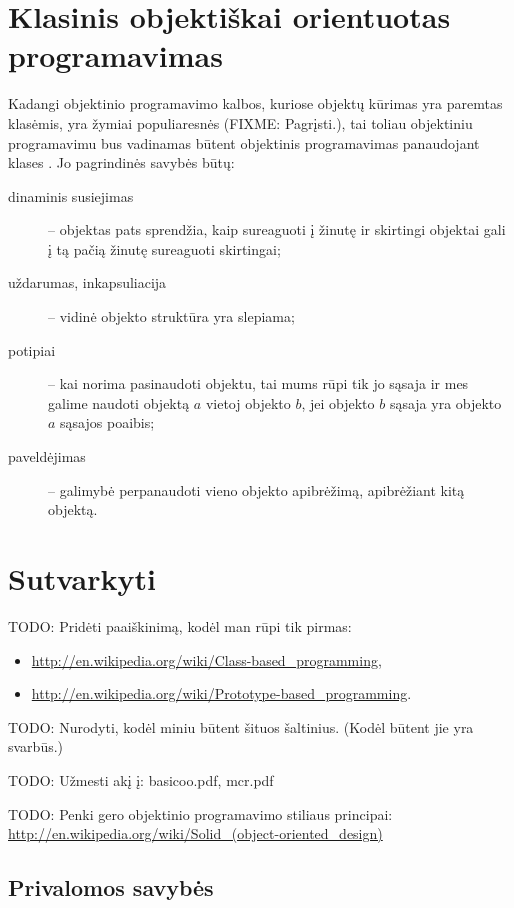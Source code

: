 \section{Klasinis objektiškai orientuotas programavimas}

Kadangi objektinio programavimo kalbos, kuriose objektų kūrimas yra
paremtas klasėmis, yra žymiai populiaresnės (FIXME: Pagrįsti.), tai
toliau objektiniu programavimu bus vadinamas būtent objektinis
programavimas panaudojant klases . Jo
pagrindinės savybės būtų:
\begin{description}
  \item[dinaminis susiejimas] – objektas pats sprendžia, kaip sureaguoti
    į žinutę ir skirtingi objektai gali į tą pačią žinutę sureaguoti
    skirtingai;
  \item[uždarumas, inkapsuliacija] – vidinė objekto struktūra yra
    slepiama;
  \item[potipiai] – kai norima pasinaudoti objektu, tai mums rūpi tik
    jo sąsaja ir mes galime naudoti objektą $a$ vietoj objekto $b$,
    jei objekto $b$ sąsaja yra objekto $a$ sąsajos poaibis;
  \item[paveldėjimas] – galimybė perpanaudoti vieno objekto apibrėžimą,
    apibrėžiant kitą objektą.
\end{description}

\section{Sutvarkyti}

TODO: Pridėti paaiškinimą, kodėl man rūpi tik pirmas:
\begin{itemize}
  \item \url{http://en.wikipedia.org/wiki/Class-based_programming},
  \item \url{http://en.wikipedia.org/wiki/Prototype-based_programming}.
\end{itemize}

TODO: Nurodyti, kodėl miniu būtent šituos šaltinius. (Kodėl būtent jie
yra svarbūs.)

TODO: Užmesti akį į: basicoo.pdf, mcr.pdf

TODO: Penki gero objektinio programavimo stiliaus principai:
\url{http://en.wikipedia.org/wiki/Solid_(object-oriented_design)}

\subsection{Privalomos savybės}
